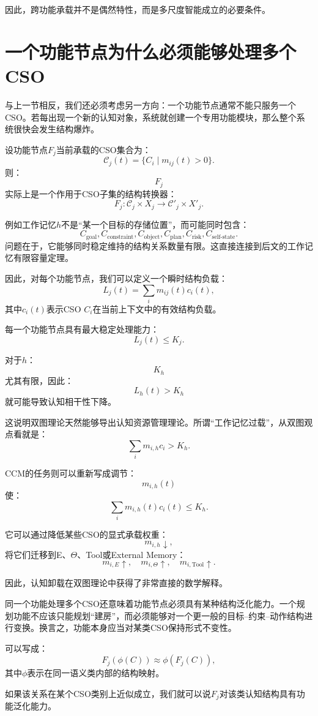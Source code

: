 因此，跨功能承载并不是偶然特性，而是多尺度智能成立的必要条件。

\section{一个功能节点为什么必须能够处理多个CSO}

与上一节相反，我们还必须考虑另一方向：一个功能节点通常不能只服务一个CSO。若每出现一个新的认知对象，系统就创建一个专用功能模块，那么整个系统很快会发生结构爆炸。

设功能节点$F_j$当前承载的CSO集合为：
\[
\mathcal C_j(t)
=
\{
C_i
\mid
m_{ij}(t)>0
\}.
\]
则：
\[
F_j
\]
实际上是一个作用于CSO子集的结构转换器：
\[
F_j:
\mathcal C_j
\times
X_j
\rightarrow
\mathcal C'_j
\times
X'_j.
\]

例如工作记忆$h$不是“某一个目标的存储位置”，而可能同时包含：
\[
C_{\text{goal}},
C_{\text{constraint}},
C_{\text{object}},
C_{\text{plan}},
C_{\text{risk}},
C_{\text{self-state}}.
\]
问题在于，它能够同时稳定维持的结构关系数量有限。这直接连接到后文的工作记忆有限容量定理。

因此，对每个功能节点，我们可以定义一个瞬时结构负载：
\[
L_j(t)
=
\sum_i
m_{ij}(t)c_i(t),
\]
其中$c_i(t)$表示CSO $C_i$在当前上下文中的有效结构负载。

每一个功能节点具有最大稳定处理能力：
\[
L_j(t)
\leq
K_j.
\]

对于$h$：
\[
K_h
\]
尤其有限，因此：
\[
L_h(t)>K_h
\]
就可能导致认知相干性下降。

这说明双图理论天然能够导出认知资源管理理论。所谓“工作记忆过载”，从双图观点看就是：
\[
\boxed{
\sum_i m_{i,h}c_i
>
K_h.
}
\]

CCM的任务则可以重新写成调节：
\[
m_{i,h}(t)
\]
使：
\[
\sum_i m_{i,h}(t)c_i(t)
\le K_h.
\]

它可以通过降低某些CSO的显式承载权重：
\[
m_{i,h}\downarrow,
\]
将它们迁移到E、$\Theta$、Tool或External Memory：
\[
m_{i,E}\uparrow,
\quad
m_{i,\Theta}\uparrow,
\quad
m_{i,\text{Tool}}\uparrow.
\]

因此，认知卸载在双图理论中获得了非常直接的数学解释。

同一个功能处理多个CSO还意味着功能节点必须具有某种结构泛化能力。一个规划功能不应该只能规划“建房”，而必须能够对一个更一般的目标--约束--动作结构进行变换。换言之，功能本身应当对某类CSO保持形式不变性。

可以写成：
\[
F_j
\left(
\phi(C)
\right)
\approx
\phi
\left(
F_j(C)
\right),
\]
其中$\phi$表示在同一语义类内部的结构映射。

如果该关系在某个CSO类别上近似成立，我们就可以说$F_j$对该类认知结构具有功能泛化能力。

